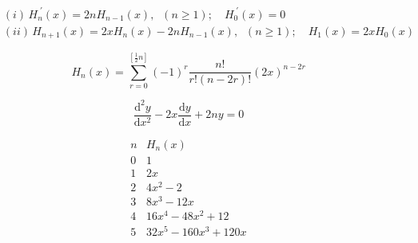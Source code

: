






\[\begin{align} \label{thrm5.6} \\\ & (i)\, H_n^{\; '}(x) = 2nH_{n-1}(x), \;\; (n \geq 1); \quad H_0^{\; '}(x) = 0 \\\ & (ii)\, H_{n+1}(x)=2xH_{n}(x)-2nH_{n-1}(x),\;\; (n\geq 1); \quad H_1(x) = 2xH_0(x) \end{align}\]

\[\begin{equation} \label{hermdef} H_{n}(x)=\sum _{r=0}^{\left[ {\frac {1}{2}n}\right ] }(-1)^r\frac{n!}{r!(n-2r)!}(2x)^{n-2r} \end{equation}\]

\[\begin{equation} \label{hermdiffeq} \frac{\mathrm{d}^2y}{\mathrm{d}x^2} - 2x\frac{\mathrm{d}y}{\mathrm{d}x} + 2ny = 0 \end{equation}\]

\[\begin{equation} \label{hermvals} {\begin{array}{r|r}n&H_{n}(x)\\\hline 0&1\\1&2x\\2&4x^{2}-2\\3&8x^{3}-12x\\4&16x^{4}-48x^{2}+12\\5&32x^5-160x^3+120x \end{array}} \end{equation}\]

